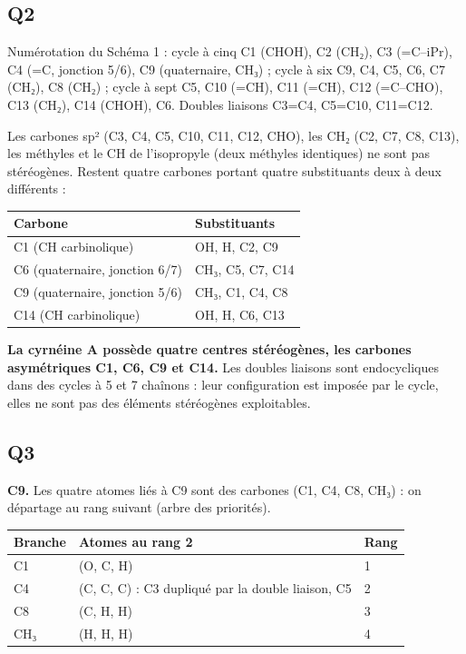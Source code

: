 \documentclass[11pt,a4paper]{article}
\newcommand{\equationajustee}[1]{%
  \sbox{\boiteequation}{$\displaystyle #1$}%
  \ifdim\wd\boiteequation>\linewidth
    \[\resizebox{\linewidth}{!}{\usebox{\boiteequation}}\]%
  \else
    \[#1\]%
  \fi}
\begin{document}
\equationajustee{\alpha=[\alpha]_\lambda^T\,\ell\,c ,\qquad \alpha<0 \text{ ici.}}

\hypertarget{q2}{%
\subsection{Q2}\label{q2}}

Numérotation du Schéma 1 : cycle à cinq C1 (CHOH), C2 (CH₂), C3 (=C--iPr), C4 (=C, jonction 5/6), C9 (quaternaire, CH₃) ; cycle à six C9, C4, C5, C6, C7 (CH₂), C8 (CH₂) ; cycle à sept C5, C10 (=CH), C11 (=CH), C12 (=C--CHO), C13 (CH₂), C14 (CHOH), C6. Doubles liaisons C3=C4, C5=C10, C11=C12.

Les carbones sp² (C3, C4, C5, C10, C11, C12, CHO), les CH₂ (C2, C7, C8, C13), les méthyles et le CH de l'isopropyle (deux méthyles identiques) ne sont pas stéréogènes. Restent quatre carbones portant quatre substituants deux à deux différents :

\begin{longtable}[]{@{}ll@{}}
\toprule\noalign{}
Carbone & Substituants \\
\midrule\noalign{}
\endhead
\bottomrule\noalign{}
\endlastfoot
C1 (CH carbinolique) & OH, H, C2, C9 \\
C6 (quaternaire, jonction 6/7) & CH₃, C5, C7, C14 \\
C9 (quaternaire, jonction 5/6) & CH₃, C1, C4, C8 \\
C14 (CH carbinolique) & OH, H, C6, C13 \\
\end{longtable}

\textbf{La cyrnéine A possède quatre centres stéréogènes, les carbones asymétriques C1, C6, C9 et C14.} Les doubles liaisons sont endocycliques dans des cycles à 5 et 7 chaînons : leur configuration est imposée par le cycle, elles ne sont pas des éléments stéréogènes exploitables.

\hypertarget{q3}{%
\subsection{Q3}\label{q3}}

\textbf{C9.} Les quatre atomes liés à C9 sont des carbones (C1, C4, C8, CH₃) : on départage au rang suivant (arbre des priorités).

\begin{longtable}[]{@{}lll@{}}
\toprule\noalign{}
Branche & Atomes au rang 2 & Rang \\
\midrule\noalign{}
\endhead
\bottomrule\noalign{}
\endlastfoot
C1 & (O, C, H) & 1 \\
C4 & (C, C, C) : C3 dupliqué par la double liaison, C5 & 2 \\
C8 & (C, H, H) & 3 \\
CH₃ & (H, H, H) & 4 \\
\end{longtable}
\end{document}

